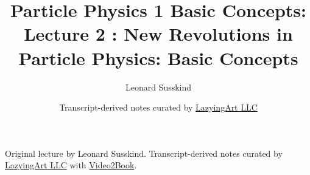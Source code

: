 \documentclass[11pt,oneside]{book}
\begin{document}
\frontmatter
\title{Particle Physics 1 Basic Concepts: Lecture 2 : New Revolutions in Particle Physics: Basic Concepts}
\author{Leonard Susskind}
\date{Transcript-derived notes curated by \href{https://lazying.art}{LazyingArt LLC}}
\maketitle
\begin{center}
\small Original lecture by Leonard Susskind. Transcript-derived notes curated by \href{https://lazying.art}{LazyingArt LLC} with \href{https://github.com/lachlanchen/Video2Book}{Video2Book}.
\end{center}
\clearpage
\mainmatter

\end{document}
